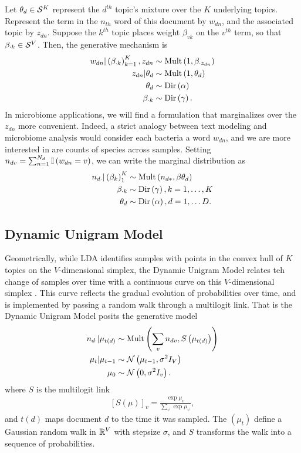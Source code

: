 \documentclass[oupdraft]{bio}
\begin{document}
Let $\theta_{d} \in \mathcal{S}^{K}$ represent the $d^{th}$ topic's mixture over the
$K$ underlying topics. Represent the term in the $n_{th}$ word of this document
by $w_{dn}$, and the associated topic by $z_{dn}$. Suppose the $k^{th}$ topic
places weight $\beta_{vk}$ on the $v^{th}$ term, so that $\beta_{\cdot k} \in
\mathcal{S}^{V}$. Then, the generative mechanism is
\begin{align*}
w_{dn} \vert \left(\beta_{\cdot k}\right)_{k = 1}^{K}, z_{dn} &\sim \textnormal{Mult}\left(1, \beta_{\cdot z_{dn}}\right) \\
z_{dn} \vert \theta_{d} &\sim \textnormal{Mult}\left(1, \theta_{d}\right) \\
\theta_{d} &\sim \textnormal{Dir}\left(\alpha\right) \\
\beta_{\cdot k} &\sim \textnormal{Dir}\left(\gamma\right).
\end{align*}
In microbiome applications, we will find a formulation that marginalizes over
the $z_{dn}$ more convenient. Indeed, a strict analogy between text modeling and
microbiome analysis would consider each bacteria a word $w_{dn}$, and we are
more interested in are counts of species across samples. Setting $n_{dv} =
\sum_{n = 1}^{N_{d}} \mathbb{I}\left({w_{dn} = v}\right)$, we can write the marginal distribution
as
\begin{align*}
n_{d\cdot} \vert \left(\beta_{k}\right)_{1}^{K} &\sim \textnormal{Mult}\left(n_{d\ast}, \beta \theta_{d}\right) \\
\beta_{\cdot k} &\sim \textnormal{Dir}\left(\gamma\right), k = 1, \dots, K \\
\theta_{d} &\sim \textnormal{Dir}\left(\alpha\right), d = 1, \dots D.
\end{align*}

\subsection{Dynamic Unigram Model}

Geometrically, while LDA identifies samples with points in the convex hull of
$K$ topics on the $V$-dimensional simplex, the Dynamic Unigram Model relates teh
change of samples over time with a continuous curve on this $V$-dimensional
simplex \citep{blei2006dynamic}. This curve reflects the gradual evolution of
probabilities over time, and is implemented by passing a random walk through a
multilogit link. That is the Dynamic Unigram Model posits the generative model
\begin{align*}
n_{d\cdot} \vert \mu_{t\left(d\right)}  &\sim \textnormal{Mult}\left(\sum_{v} n_{dv}, S\left(\mu_{t\left(d\right)}\right)\right) \\
\mu_{t} \vert \mu_{t - 1} &\sim \mathcal{N}\left(\mu_{t - 1}, \sigma^{2}I_{V}\right) \\
\mu_{0} &\sim \mathcal{N}\left(0, \sigma^{2}I_{v}\right).
\end{align*}
where $S$ is the multilogit link
\begin{align*}
\left[S\left(\mu\right)\right]_{v} = \frac{\exp{\mu_{v}}}{\sum_{v^{\prime}} \exp{\mu_{v^{\prime}}}},
\end{align*}
and $t\left(d\right)$ maps document $d$ to the time it was sampled. The
$\left(\mu_{t}\right)$ define a Gaussian random walk in $\mathbb{R}^{V}$ with
stepsize $\sigma$, and $S$ transforms the walk into a sequence of probabilities.
\end{document}
